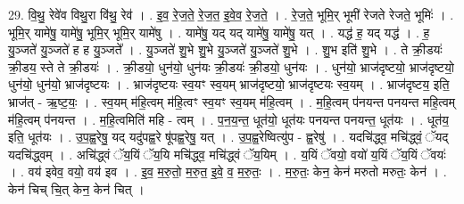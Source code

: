 \documentclass[17pt]{extarticle}
\begin{document}
29. वि॒थु॒ रेवे॑व विथु॒रा वि॑थु॒ रेव॑ । . इ॒व॒ रे॒ज॒ते॒ रे॒ज॒त॒ इ॒वे॒व॒ रे॒ज॒ते॒ । . रे॒ज॒ते॒ भूमि॒र् भूमी॑ रेजते रेजते॒ भूमिः॑ । . भूमि॒र् यामे॑षु॒ यामे॑षु॒ भूमि॒र् भूमि॒र् यामे॑षु । . यामे॑षु॒ यद् यद् यामे॑षु॒ यामे॑षु॒ यत् । . यद्ध॑ ह॒ यद् यद्ध॑ । . ह॒ यु॒ञ्जते॑ यु॒ञ्जते॑ ह ह यु॒ञ्जते᳚ । . यु॒ञ्जते॑ शु॒भे शु॒भे यु॒ञ्जते॑ यु॒ञ्जते॑ शु॒भे । . शु॒भ इति॑ शु॒भे । . ते क्री॒डयः॑ क्री॒डय॒ स्ते ते क्री॒डयः॑ । . क्री॒डयो॒ धुन॑यो॒ धुन॑यः क्री॒डयः॑ क्री॒डयो॒ धुन॑यः । . धुन॑यो॒ भ्राज॑दृष्टयो॒ भ्राज॑दृष्टयो॒ धुन॑यो॒ धुन॑यो॒ भ्राज॑दृष्टयः । . भ्राज॑दृष्टयः स्व॒यꣳ स्व॒यम् भ्राज॑दृष्टयो॒ भ्राज॑दृष्टयः स्व॒यम् । . भ्राज॑दृष्टय॒ इति॒ भ्राज॑त् - ऋ॒ष्ट॒यः॒ । . स्व॒यम् म॑हि॒त्वम् म॑हि॒त्वꣳ स्व॒यꣳ स्व॒यम् म॑हि॒त्वम् । . म॒हि॒त्वम् प॑नयन्त पनयन्त महि॒त्वम् म॑हि॒त्वम् प॑नयन्त । . म॒हि॒त्वमिति॑ महि - त्वम् । . प॒न॒य॒न्त॒ धूत॑यो॒ धूत॑यः पनयन्त पनयन्त॒ धूत॑यः । . धूत॑य॒ इति॒ धूत॑यः । . उ॒प॒ह्व॒रेषु॒ यद् यदु॑पह्व॒रे षू॑पह्व॒रेषु॒ यत् । . उ॒प॒ह्व॒रेष्वित्यु॑प - ह्व॒रेषु॑ । . यदचि॑द्ध्व॒ मचि॑द्ध्वं॒ ॅयद् यदचि॑द्ध्वम् । . अचि॑द्ध्वं ॅय॒यिं ॅय॒यि मचि॑द्ध्व॒ मचि॑द्ध्वं ॅय॒यिम् । . य॒यिं ॅवयो॒ वयो॑ य॒यिं ॅय॒यिं ॅवयः॑ । . वय॑ इवेव॒ वयो॒ वय॑ इव । . इ॒व॒ म॒रु॒तो॒ म॒रु॒त॒ इ॒वे॒ व॒ म॒रु॒तः॒ । . म॒रु॒तः॒ केन॒ केन॑ मरुतो मरुतः॒ केन॑ । . केन॑ चिच् चि॒त् केन॒ केन॑ चित् । \newline
\end{document}
